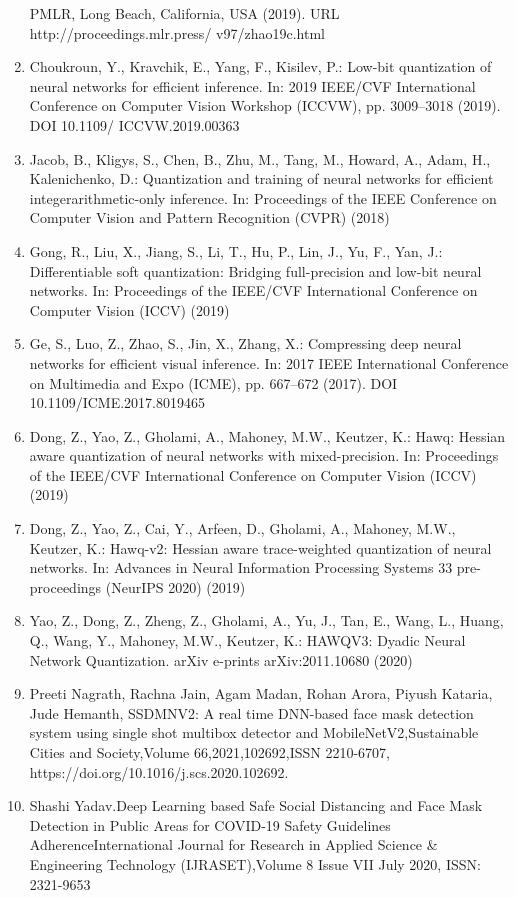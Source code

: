 \documentclass[12pt,a4paper]{article}
\begin{document}
\begin{enumerate}
PMLR, Long Beach, California, USA (2019). URL http://proceedings.mlr.press/
v97/zhao19c.html
\item Choukroun, Y., Kravchik, E., Yang, F., Kisilev, P.: Low-bit quantization of neural
networks for efficient inference. In: 2019 IEEE/CVF International Conference
on Computer Vision Workshop (ICCVW), pp. 3009–3018 (2019). DOI 10.1109/
ICCVW.2019.00363
\item Jacob, B., Kligys, S., Chen, B., Zhu, M., Tang, M., Howard, A., Adam, H.,
Kalenichenko, D.: Quantization and training of neural networks for efficient integerarithmetic-only inference. In: Proceedings of the IEEE Conference on Computer
Vision and Pattern Recognition (CVPR) (2018)
\item Gong, R., Liu, X., Jiang, S., Li, T., Hu, P., Lin, J., Yu, F., Yan, J.: Differentiable
soft quantization: Bridging full-precision and low-bit neural networks. In: Proceedings of the IEEE/CVF International Conference on Computer Vision (ICCV)
(2019)
\item Ge, S., Luo, Z., Zhao, S., Jin, X., Zhang, X.: Compressing deep neural networks for
efficient visual inference. In: 2017 IEEE International Conference on Multimedia
and Expo (ICME), pp. 667–672 (2017). DOI 10.1109/ICME.2017.8019465
\item Dong, Z., Yao, Z., Gholami, A., Mahoney, M.W., Keutzer, K.: Hawq: Hessian
aware quantization of neural networks with mixed-precision. In: Proceedings of
the IEEE/CVF International Conference on Computer Vision (ICCV) (2019)
\item Dong, Z., Yao, Z., Cai, Y., Arfeen, D., Gholami, A., Mahoney, M.W., Keutzer,
K.: Hawq-v2: Hessian aware trace-weighted quantization of neural networks. In:
Advances in Neural Information Processing Systems 33 pre-proceedings (NeurIPS
2020) (2019)
\item Yao, Z., Dong, Z., Zheng, Z., Gholami, A., Yu, J., Tan, E., Wang, L., Huang,
Q., Wang, Y., Mahoney, M.W., Keutzer, K.: HAWQV3: Dyadic Neural Network
Quantization. arXiv e-prints arXiv:2011.10680 (2020)
\item Preeti Nagrath, Rachna Jain, Agam Madan, Rohan Arora, Piyush Kataria, Jude Hemanth,
SSDMNV2: A real time DNN-based face mask detection system using single shot multibox detector and MobileNetV2,Sustainable Cities and Society,Volume 66,2021,102692,ISSN 2210-6707, https://doi.org/10.1016/j.scs.2020.102692.
\item Shashi Yadav.Deep Learning based Safe Social Distancing and Face Mask Detection in Public Areas for COVID-19 Safety Guidelines AdherenceInternational Journal for Research in Applied Science \& Engineering Technology (IJRASET),Volume 8 Issue VII July 2020, ISSN: 2321-9653
\end{enumerate}
\end{document}

